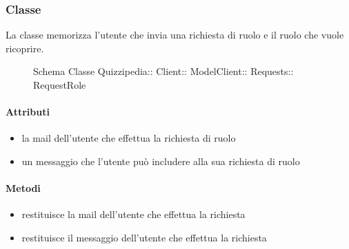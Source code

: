 \subsubsection{Classe }
La classe memorizza l'utente che invia una richiesta di ruolo e il ruolo che vuole ricoprire.
\begin{figure}[H]
\centering
\noindent{}
\caption[Schema Classe RequestRole]{Schema Classe Quizzipedia:: Client:: ModelClient:: Requests:: RequestRole}
\end{figure}
\paragraph{Attributi}
\begin{itemize}
\item {}
\newline
la mail dell'utente che effettua la richiesta di ruolo
\item {}
\newline
un messaggio che l'utente può includere alla sua richiesta di ruolo
\end{itemize}
\paragraph{Metodi}
\begin{itemize}
\item {}
\newline
restituisce la mail dell'utente che effettua la richiesta
\newline
\item {}
\newline
restituisce il messaggio dell'utente che effettua la richiesta
\newline
\end{itemize}
